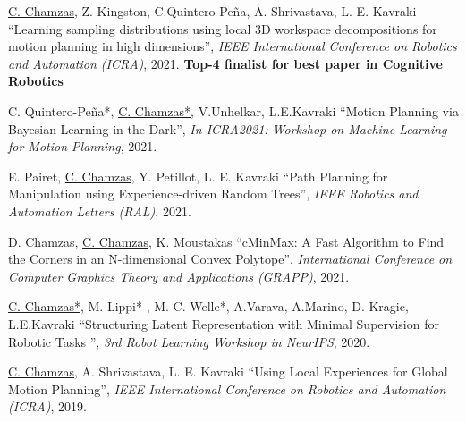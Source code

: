\documentclass[letterpaper,11pt]{article}
\begin{document}
\begin{thebibliography}{14}
    \underline{C. Chamzas}, Z. Kingston, C.Quintero-Peña, A. Shrivastava, L. E. Kavraki
	``Learning sampling distributions using local 3D workspace decompositions for motion planning in high dimensions'',
    \textit{IEEE International Conference on Robotics and Automation (ICRA)}, 2021.
    \textbf{Top-4 finalist for best paper in Cognitive Robotics} 

     C. Quintero-Peña*, \underline{C. Chamzas*}, V.Unhelkar, L.E.Kavraki
	``Motion Planning via Bayesian Learning in the Dark'',
    \textit{In ICRA2021: Workshop on Machine Learning for Motion Planning}, 2021.  

	E. Pairet, \underline{C. Chamzas}, Y. Petillot, L. E. Kavraki
	``Path Planning for Manipulation using Experience-driven Random Trees'',
    \textit{IEEE Robotics and Automation Letters (RAL)}, 2021.
	
	D. Chamzas, \underline{C. Chamzas}, K. Moustakas
	``cMinMax: A Fast Algorithm to Find the Corners in an N-dimensional Convex Polytope'',
    \textit{International Conference on Computer Graphics Theory and Applications (GRAPP)}, 2021. 

	\underline{C. Chamzas*}, M. Lippi* , M. C. Welle*, A.Varava, A.Marino, D. Kragic, L.E.Kavraki
    ``Structuring Latent Representation with Minimal Supervision for Robotic Tasks '',
    \textit{3rd Robot Learning Workshop in NeurIPS}, 2020. 

	\underline{C. Chamzas}, A. Shrivastava, L. E. Kavraki
	``Using Local Experiences for Global Motion Planning'',
    \textit{IEEE International Conference on Robotics and Automation (ICRA)}, 2019.
   
	\end{thebibliography}
	\endgroup
\end{document}
